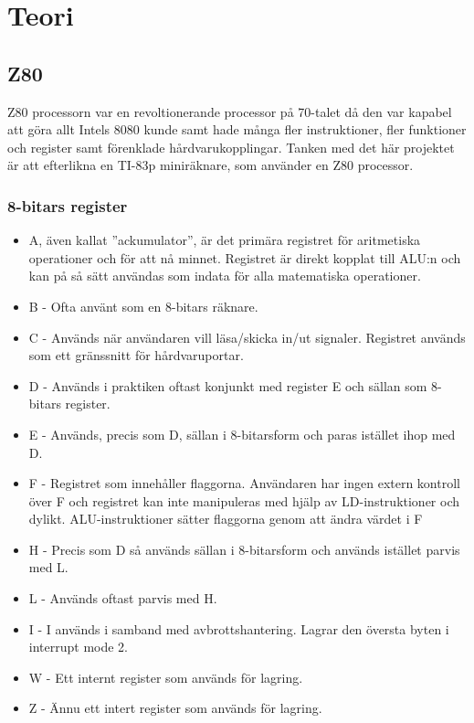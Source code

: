 \documentclass[main.tex]{subfiles}
\begin{document}
\section{Teori}
\subsection{Z80}
Z80 processorn var en revoltionerande processor på 70-talet då den var kapabel
att göra allt Intels 8080 kunde samt hade många fler instruktioner, fler
funktioner och register samt förenklade hårdvarukopplingar. Tanken med det här
projektet är att efterlikna en TI-83p miniräknare, som använder en Z80
processor.
\subsubsection{8-bitars register}
\begin{itemize}
    \item A, även kallat ''ackumulator'', är det primära registret för
    aritmetiska operationer och för att nå minnet. Registret är direkt kopplat
    till ALU:n och kan på så sätt användas som indata för alla matematiska
    operationer.
    \item B - Ofta använt som en 8-bitars räknare.
    \item C - Används när användaren vill läsa/skicka in/ut signaler. Registret
    används som ett gränssnitt för hårdvaruportar.
    \item D - Används i praktiken oftast konjunkt med register E och sällan som
    8-bitars register.
    \item E - Används, precis som D, sällan i 8-bitarsform och paras istället
    ihop med D.
    \item F - Registret som innehåller flaggorna. Användaren har ingen extern
    kontroll över F och registret kan inte manipuleras med hjälp av
    LD-instruktioner och dylikt. ALU-instruktioner sätter flaggorna genom att
    ändra värdet i F
    \item H - Precis som D så används sällan i 8-bitarsform och används
    istället parvis med L.
    \item L - Används oftast parvis med H.
    \item I - I används i samband med avbrottshantering. Lagrar den översta
    byten i interrupt mode 2.
    \item W - Ett internt register som används för lagring.
    \item Z - Ännu ett intert register som används för lagring.
\end{itemize}
\end{document}
